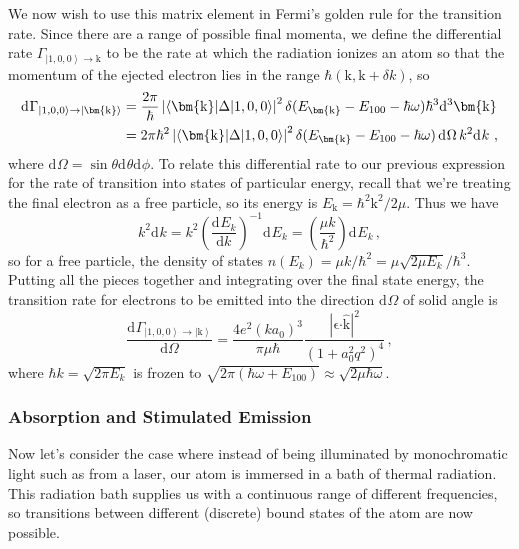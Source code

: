 \documentclass{article}
\theoremstyle{plain}\theoremheaderfont{\normalfont\itshape}\theorembodyfont{\rmfamily}\theoremseparator{.}\newtheorem*{rem}{Remark}\newtheorem*{ex}{Example}\newtheorem*{proof}{Proof}\newtheorem*{altp}{Alternative proof}
\theoremstyle{plain}\theoremheaderfont{\normalfont\bfseries}\theorembodyfont{\rmfamily}\theoremseparator{.}\newtheorem{thm}{Theorem}[section]\newtheorem{lem}[thm]{Lemma}\newtheorem{prop}[thm]{Proposition}\newtheorem*{cor}{Corollary}\newtheorem{defn}[thm]{Definition}\newtheorem{clm}[thm]{Claim}\newtheorem{clminproof}{Claim}
\theoremstyle{break}\theoremheaderfont{\normalfont\itshape}\theorembodyfont{\rmfamily}\theoremseparator{.\medskip}\newtheorem*{proofskip}{Proof}\newtheorem*{exs}{Examples}\newtheorem*{rems}{Remarks}
\theoremstyle{break}\theoremheaderfont{\normalfont\bfseries}\theorembodyfont{\rmfamily}\theoremseparator{.\medskip}\newtheorem{lemskip}[thm]{Lemma}\newtheorem{defnskip}[thm]{Definition}\newtheorem{propskip}[thm]{Proposition}\newtheorem{thmskip}[thm]{Theorem}
\numberwithin{equation}{section}
\newcommand{\dd}[2][]{\mathrm{d}^{#1} #2\,}
\renewcommand{\d}[2][]{\mathrm{d}^{#1} #2}
\newcommand{\dv}[3][]{\frac{\mathrm{d}^{#1} #2}{{\mathrm{d} #3}^{#1}}}
\newcommand{\ket}[1]{\left| #1 \right\rangle}
\newcommand{\mel}[3]{\left\langle #1 \middle| #2 \middle| #3 \right\rangle}
\newcommand{\vb}[1]{\bm{\mathrm{#1}}}
\newcommand{\vu}[1]{\hat{\bm{\mathrm{#1}}}}
\newcommand{\vdot}{\bm{\cdot}}
\newcommand{\abs}[1]{\left| #1 \right|}
\begin{document}
    We now wish to use this matrix element in Fermi's golden rule for the transition rate. Since there are a range of possible final momenta, we define the differential rate \(\Gamma_{\ket{1,0,0}\to\vb{k}}\) to be the rate at which the radiation ionizes an atom so that the momentum of the ejected electron lies in the range \(\hbar(\vb{k},\vb{k}+\delta k)\), so
    \begin{align}
        \d{\Gamma_{\ket{1,0,0}\to\ket{\vb{k}}}}&=\frac{2\pi}{\hbar}\abs{\mel{\vb{k}}{\Delta}{1,0,0}}^2\delta(E_{\vb{k}}-E_{100}-\hbar\omega)\hbar^3\d[3]{\vb{k}}\notag\\
        &=2\pi\hbar^2\abs{\mel{\vb{k}}{\Delta}{1,0,0}}^2\delta(E_{\vb{k}}-E_{100}-\hbar\omega)\,\dd{\Omega}k^2\dd{k}\,,
    \end{align}
    where \(\d{\Omega}=\sin\theta\d{\theta}\d{\phi}\). To relate this differential rate to our previous expression for the rate of transition into states of particular energy, recall that we're treating the final electron as a free particle, so its energy is \(E_{\vb{k}}=\hbar^2\vb{k}^2/2\mu\). Thus we have
    \begin{equation}
        k^2\d{k}=k^2\left(\dv{E_k}{k}\right)^{-1}\d{E_k}=\left(\frac{\mu k}{\hbar^2}\right)\d{E_k}\,,
    \end{equation}
    so for a free particle, the density of states \(n(E_k)=\mu k/\hbar^2=\mu\sqrt{2\mu E_k}/\hbar^3\). Putting all the pieces together and integrating over the final state energy, the transition rate for electrons to be emitted into the direction \(\d{\Omega}\) of solid angle is
    \begin{equation}
        \dv{\Gamma_{\ket{1,0,0}\to\ket{\vb{k}}}}{\Omega}=\frac{4e^2(ka_0)^3}{\pi\mu\hbar}\frac{\abs{\vb{\epsilon}\vdot\vu{k}}^2}{(1+a_0^2q^2)^4}\,,
    \end{equation}
    where \(\hbar k=\sqrt{2\pi E_k}\) is frozen to \(\sqrt{2\pi(\hbar\omega+E_{100})}\approx\sqrt{2\mu\hbar\omega}\).

    \subsubsection{Absorption and Stimulated Emission}
    Now let's consider the case where instead of being illuminated by monochromatic light such as from a laser, our atom is immersed in a bath of thermal radiation. This radiation bath supplies us with a continuous range of different frequencies, so transitions between different (discrete) bound states of the atom are now possible.
\end{document}
